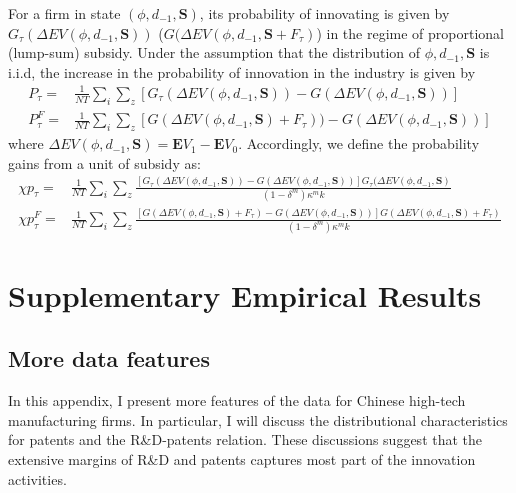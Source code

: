 \documentclass[English]{article}
\begin{document}
For a firm in state $(\phi, d_{-1}, \mathbf{S})$, its probability of innovating is given by $G_\tau(\Delta EV(\phi, d_{-1}, \mathbf{S}))$ ($G(\Delta EV(\phi, d_{-1}, \mathbf{S}+F_\tau)$) in the regime of proportional (lump-sum) subsidy. Under the assumption that the distribution of $\phi, d_{-1}, \mathbf{S}$ is i.i.d, the increase in the probability of innovation in the industry is given by 
\begin{align}
P_\tau=&\frac{1}{NT}\sum_{i}\sum_{z}\left[G_\tau(\Delta EV(\phi, d_{-1}, \mathbf{S}))-G(\Delta EV(\phi, d_{-1}, \mathbf{S}))\right]\\
P_{\tau}^F=&\frac{1}{NT}\sum_{i}\sum_{z}\left[G(\Delta EV(\phi, d_{-1}, \mathbf{S})+F_\tau))-G(\Delta EV(\phi, d_{-1}, \mathbf{S}))\right]
\end{align}
where $\Delta EV(\phi, d_{-1}, \mathbf{S})=\mathbf{E}V_1-\mathbf{E}V_0$.
Accordingly, we define the probability gains from a unit of subsidy as:
\begin{align}
\chi p_{\tau}=&\frac{1}{NT}\sum_{i}\sum_{z}\frac{\left[G_\tau(\Delta EV(\phi, d_{-1}, \mathbf{S}))-G(\Delta EV(\phi, d_{-1}, \mathbf{S}))\right]G_\tau(\Delta EV(\phi, d_{-1}, \mathbf{S})}{(1-\delta^m)\kappa^mk} \\
\chi p_{\tau}^F=&\frac{1}{NT}\sum_{i}\sum_{z}\frac{\left[G(\Delta EV(\phi, d_{-1}, \mathbf{S})+F_\tau)-G(\Delta EV(\phi, d_{-1}, \mathbf{S}))\right]G(\Delta EV(\phi, d_{-1}, \mathbf{S})+F_\tau)}{(1-\delta^m)\kappa^m k}
\end{align}

\section{Supplementary Empirical Results}

\setcounter{table}{0} %
\renewcommand{\tablename}{Table} %
\renewcommand\thetable{\thesection.\arabic{table}}
\setcounter{figure}{0}
\subsection{More data features}
In this appendix, I present more features of the
data for Chinese high-tech manufacturing firms. In particular, I will discuss the distributional characteristics for patents and the R&D-patents relation. These discussions suggest that the extensive margins of R\&D and patents captures most part of the innovation activities. 
\end{document}
